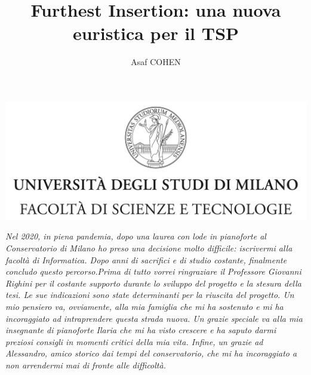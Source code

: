 \documentclass[a4paper,12pt]{report}
\begin{document}
\includegraphics{tesiSCIENZE_TECNOLOGIE.jpg}
\title{Furthest Insertion: una nuova euristica per il TSP}
\author{Asaf COHEN}
%
% 
%

\beforepreface

\clearpage
\null
\thispagestyle{empty}
\clearpage

{ \Large {\sl Nel 2020, in piena pandemia, dopo una laurea con lode in pianoforte al Conservatorio di Milano ho preso una decisione molto difficile: iscrivermi alla facoltà di Informatica. Dopo anni di sacrifici e di studio costante, finalmente concludo questo percorso.\newline Prima di tutto vorrei ringraziare il Professore Giovanni Righini per il costante supporto durante lo sviluppo del progetto e la stesura della tesi. Le sue indicazioni sono state determinanti per la riuscita del progetto. \newline Un mio pensiero va, ovviamente, alla mia famiglia che mi ha sostenuto e mi ha incoraggiato ad intraprendere questa strada nuova. \newline Un grazie speciale va alla mia insegnante di pianoforte Ilaria che mi ha visto crescere e ha saputo darmi preziosi consigli in momenti critici della mia vita. \newline Infine, un grazie ad Alessandro, amico storico dai tempi del conservatorio, che mi ha incoraggiato a non arrendermi mai di fronte alle difficoltà.}}
% 
%
\end{document}
